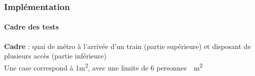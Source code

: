 \begin{frame}
    \frametitle{Implémentation}
    \framesubtitle{Cadre des tests}

    \textbf{Cadre} : quai de métro à l'arrivée d'un train (partie supérieure) et disposant de plusieurs accès (partie inférieure) \\[.3cm]

     Une case correspond à \num{1}\si{\metre \squared}, avec une limite de 6 \si{personnes \per \metre \squared}




\end{frame}

